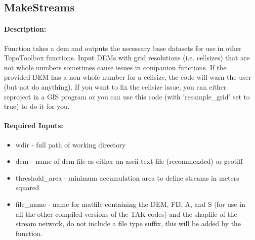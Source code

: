 \subsection{MakeStreams}
\paragraph{Description:}
Function takes a dem and outputs the necessary base datasets for use in other TopoToolbox functions.
Input DEMs with grid resolutions (i.e. cellsizes) that are not whole numbers sometimes cause issues
in companion functions. If the provided DEM has a non-whole number for a cellsize, the code will
warn the user (but not do anything). If you want to fix the cellsize issue, you can either reproject
in a GIS program or you can use this code (with 'resample\_grid' set to true) to do it for you.

\paragraph{Required Inputs:}
\begin{itemize}
\item wdir - full path of working directory
\item dem - name of dem file as either an ascii text file (recommended) or geotiff 
\item threshold\_area - minimum accumulation area to define streams in meters squared
\item file\_name - name for matfile containing the DEM, FD, A, and S (for use in all the other compiled versions
of the TAK codes) and the shapfile of the stream network, do not include a file type suffix, this will be
added by the function.
\end{itemize}

